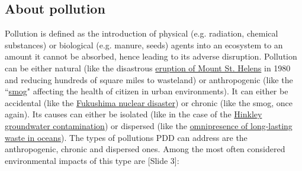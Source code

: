 \documentclass{article}
\begin{document}
\subsection{About pollution}
\label{sec:pollution}
Pollution is defined as the introduction of physical (e.g. radiation, chemical substances) or biological (e.g. manure, seeds) agents into an ecosystem to an amount it cannot be absorbed, hence leading to its adverse disruption. Pollution can be either natural (like the disastrous \href{https://en.wikipedia.org/wiki/1980_eruption_of_Mount_St._Helens}{eruption of Mount St. Helens} in 1980 and reducing hundreds of square miles to wasteland) or anthropogenic (like the ``\href{https://en.wikipedia.org/wiki/Smog}{smog}" affecting the health of citizen in urban environments). It can either be accidental (like the \href{https://en.wikipedia.org/wiki/Fukushima_Daiichi_nuclear_disaster}{Fukushima nuclear disaster}) or chronic (like the smog, once again). Its causes can either be isolated (like in the case of the \href{https://en.wikipedia.org/wiki/Hinkley_groundwater_contamination}{Hinkley groundwater contamination}) or dispersed (like the \href{https://en.wikipedia.org/wiki/Marine_debris}{omnipresence of long-lasting waste in oceans}). The types of pollutions PDD can address are the anthropogenic, chronic and dispersed ones. Among the most often considered environmental impacts of this type are {\color{blue}[Slide 3]}:
\end{document}
